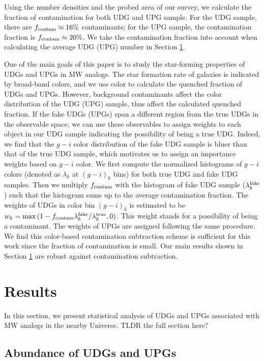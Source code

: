 \documentclass[twocolumn,astrosymb,twocolappendix]{aastex631}
\begin{document}
\begin{CJK*}{UTF8}{gbsn}
Using the number densities and the probed area of our survey, we calculate the fraction of contamination for both UDG and UPG sample. For the UDG sample, there are $f_{\rm contam} \approx 16\%$ contaminants; for the UPG sample, the contamination fraction is $f_{\rm contam} \approx 20\%$. We take the contamination fraction into account when calculating the average UDG (UPG) number in Section \ref{sec:results}. 

One of the main goals of this paper is to study the star-forming properties of UDGs and UPGs in MW analogs. The star formation rate of galaxies is indicated by broad-band colors, and we use color to calculate the quenched fraction of UDGs and UPGs. However, background contaminants affect the color distribution of the UDG (UPG) sample, thus affect the calculated quenched fraction. If the fake UDGs (UPGs) span a different region from the true UDGs in the observable space, we can use these observables to assign weights to each object in our UDG sample indicating the possibility of being a true UDG. Indeed, we find that the $g-i$ color distribution of the fake UDG sample is bluer than that of the true UDG sample, which motivates us to assign an importance weights based on $g-i$ color. We first compute the normalized histograms of $g-i$ colors (denoted as $\lambda_k$ at $(g-i)_{k}$ bins) for both true UDG and fake UDG samples. Then we multiply $f_{\rm contam}$ with the histogram of fake UDG sample ($\lambda_k^{\rm fake}$) such that the histogram sums up to the average contamination fraction. The weights of UDGs in color bin $(g-i)_k$ is estimated to be $w_k = \max\,(1 - f_{\rm contam} \lambda_k^{\rm fake} / \lambda_k^{\rm true}, 0)$. This weight stands for a possibility of being a contaminant. The weights of UPGs are assigned following the same procedure. We find this color-based contamination subtraction scheme is sufficient for this work since the fraction of contamination is small. Our main results shown in Section \ref{sec:results} are robust against contamination subtraction. 


\section{Results}\label{sec:results}
In this section, we present statistical analysis of UDGs and UPGs associated with MW analogs in the nearby Universe. TLDR the full section here?

\subsection{Abundance of UDGs and UPGs}\label{sec:n_udg}


\end{CJK*}
\end{document}
